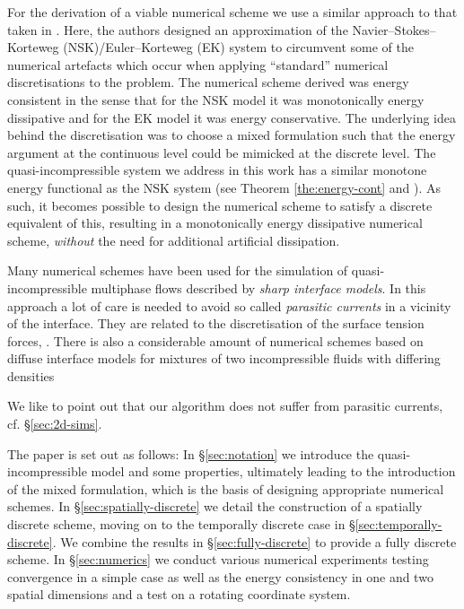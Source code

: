 \documentclass[final]{amsart}
\numberwithin{equation}{section}
\begin{document}
For the derivation of a viable numerical scheme we use a similar
approach to that taken in
\cite{GiesselmannMakridakisPryer:2012}. Here, the authors designed an
approximation of the Navier--Stokes--Korteweg (NSK)/Euler--Korteweg
(EK) system to circumvent some of the numerical artefacts which occur
when applying ``standard'' numerical discretisations to the
problem. The numerical scheme derived was energy consistent in the
sense that for the NSK model it was monotonically energy dissipative
and for the EK model it was energy conservative. The underlying idea
behind the discretisation was to choose a mixed formulation such that
the energy argument at the continuous level could be mimicked at the
discrete level. The quasi-incompressible system we address in this
work has a similar monotone energy functional as the NSK system (see
Theorem \ref{the:energy-cont} and \cite[Lemma
2.3]{GiesselmannMakridakisPryer:2012}).  As such, it becomes possible
to design the numerical scheme to satisfy a discrete equivalent of
this, resulting in a monotonically energy dissipative numerical
scheme, \emph{without} the need for additional artificial dissipation.

Many numerical schemes have been used for the simulation of
{quasi-}incompressible multiphase flows described by \emph{sharp
  interface models}.  In this approach a lot of care is needed to
avoid so called \emph{parasitic currents} in a vicinity of the
interface. They are related to the discretisation of the surface
tension forces, \cite[e.g.]{BKZ92, SZ99, VC00,BGN}. {There
  is also a considerable amount of numerical schemes based on diffuse
  interface models for mixtures of two incompressible fluids with
  differing densities \cite[e.g.]{ALV10,Ding:2007,Dong:2012,Sussman,ZhangTang,LiuShen,ShenYang}
}

We like to point out that our
algorithm does not suffer from parasitic currents,
cf. \S\ref{sec:2d-sims}.

The paper is set out as follows: In \S\ref{sec:notation} we introduce
the quasi-incompressible model and some properties, ultimately leading
to the introduction of the mixed formulation, which is the basis of
designing appropriate numerical schemes. In
\S\ref{sec:spatially-discrete} we detail the construction of a
spatially discrete scheme, moving on to the temporally discrete case
in \S\ref{sec:temporally-discrete}. We combine the results in
\S\ref{sec:fully-discrete} to provide a fully discrete scheme. In
\S\ref{sec:numerics} we conduct various numerical experiments testing
convergence in a simple case as well as the energy consistency in one
and two spatial dimensions and a test on a rotating coordinate system.
\end{document}
